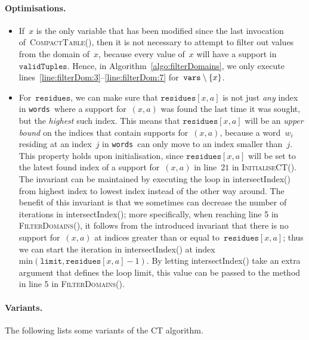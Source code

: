 \documentclass[a4paper,11pt]{article}
\theoremstyle{definition}
\newcommand{\Algoref}[1]{Algorithm~\ref{#1}}
\newcommand{\linesref}[2]{lines~\ref{#1}--\ref{#2}}
\newcommand{\Words}{\texttt{words}}
\newcommand{\Limit}{\texttt{limit}}
\newcommand{\CurrTable}{\texttt{validTuples}}
\newcommand{\Residues}{\texttt{residues}}
\newcommand{\Vars}{\texttt{vars}}
\def\CompactTable{\textsc{Compact\-Table}}
\def\FilterDomains{\textsc{Filter\-Domains}}
\def\InitialiseCT{\textsc{Initialise\-CT}}
\numberwithin{equation}{section}
\begin{document}
\paragraph{Optimisations.}
\begin{itemize}
  \item If~$x$ is the only variable
    that has been modified since the last invocation of~\CompactTable(),
    then it is not necessary to attempt to filter out values from
    the domain of~$x$, because every value of~$x$ will have a
    support in~$\CurrTable$.
    Hence, in \Algoref{algo:filterDomains}, we only execute
    \linesref{line:filterDom:3}{line:filterDom:7} for~$\Vars \setminus \Set{x}$.

  \item For~$\Residues$, we can make sure that $\Residues[x,a]$ is not just
    \emph{any} index in \Words~where a support for~$(x,a)$ was found the last time
    it was sought, but the \emph{highest} such index.
    This means that $\Residues[x,a]$
    will be an \emph{upper bound} on the indices that contain supports
    for~$(x,a)$, because a word~$w_i$ residing at an index~$j$ in
    \Words~can only move to an index smaller than~$j$.
    This property holds upon initialisation, since
    $\Residues[x,a]$ will be set to the latest found index of a support for~$(x,a)$
    in line~$21$ in \InitialiseCT(). The invariant can be maintained by
    executing the loop in intersectIndex() from highest index to lowest
    index instead of the other way around.
    The benefit of this invariant is that we sometimes can decrease the
    number of iterations in intersectIndex();
    more specifically, when reaching line 5 in \FilterDomains(), it follows
    from the introduced invariant that there is no support
    for~$(x,a)$ at indices greater than or equal to~$\Residues[x,a]$;
    thus we can start the iteration in intersectIndex()
    at index~$\text{min}(\Limit,\Residues[x,a]-1)$.
    By letting intersectIndex() take an extra argument that defines the loop
    limit, this value can be passed to the method in line 5 in \FilterDomains().

\end{itemize}

\paragraph{Variants.}
The following lists some variants of the CT algorithm.
\newline
\end{document}
